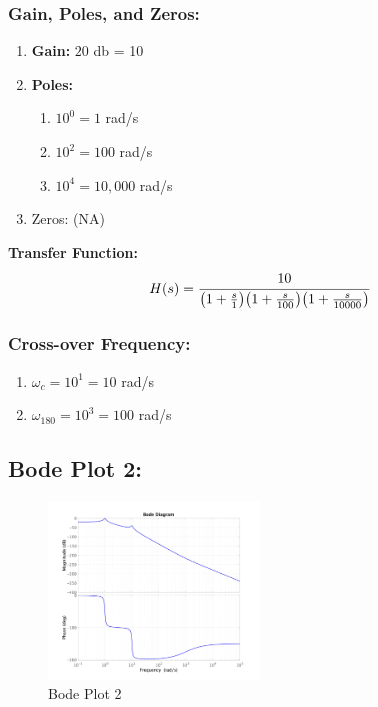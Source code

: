 \documentclass[letter]{article}
\numberwithin{equation}{section}
\begin{document}
\subsubsection{Gain, Poles, and Zeros:}
\begin{enumerate}
	\item \textbf{Gain:}  $20$ db = 10
	\item \textbf{Poles:}
	\begin{enumerate}
		\item $10^{0} = 1$ rad/s
		\item $10^{2} = 100$ rad/s
		\item $10^{4} = 10,000$ rad/s
	\end{enumerate}
	\item Zeros: (NA)
\end{enumerate}

\textbf{Transfer Function:}\[
	H(s) = \cfrac{10}{
		\qty(1 + \frac{s}{1}) \qty(1 + \frac{s}{100}) \qty(1 + \frac{s}{10000})
		}
\]

\subsubsection{Cross-over Frequency:}
\begin{enumerate}
	\item $\omega_c = 10^{1} = 10$ rad/s
	\item $\omega_{180} = 10^{3} = 100$ rad/s
\end{enumerate}



\newpage
\subsection{Bode Plot 2:}
\begin{figure}[ht]
	\centering
	\includegraphics[width=0.5\textwidth]{figs/pblm3b.jpg}
	\caption{Bode Plot 2}
\end{figure}
\end{document}
